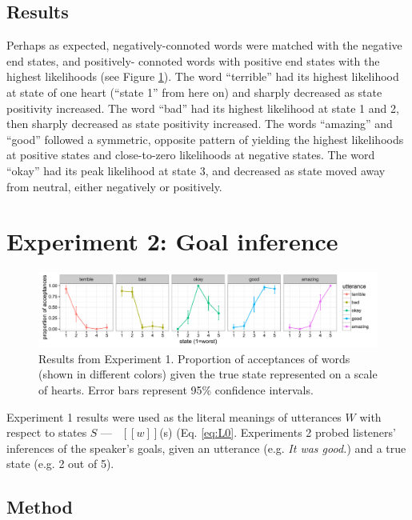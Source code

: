 \documentclass[10pt,letterpaper]{article}
\newcommand{\denote}[1]{\mbox{ $[\![ #1 ]\!]$}}
\begin{document}
\subsection{Results}

Perhaps as expected, negatively-connoted words were matched with the negative end states, and positively- connoted words with positive end states with the highest likelihoods (see Figure \ref{fig:exp1}). The word ``terrible'' had its highest likelihood at state of one heart (``state 1'' from here on) and sharply decreased as state positivity increased. The word ``bad'' had its highest likelihood at state 1 and 2, then sharply decreased as state positivity increased. The words ``amazing'' and ``good'' followed a symmetric, opposite pattern of yielding the highest likelihoods at positive states and close-to-zero likelihoods at negative states. The word ``okay'' had its peak likelihood at state 3, and decreased as state moved away from neutral, either negatively or positively.

\section{Experiment 2: Goal inference}

\begin{figure}[t]
\begin{center} 
  \includegraphics[width=.9\textwidth]{figures/exp1.pdf}
  \caption{\label{fig:exp1} Results from Experiment 1. Proportion of acceptances of words (shown in different colors) given the true state represented on a scale of hearts. Error bars represent 95\% confidence intervals.}
  \end{center} 
\end{figure}

Experiment 1 results were used as the literal meanings of utterances $W$ with respect to states $S$ --- \denote{w}(s) (Eq. \ref{eq:L0}.
Experiments 2 probed listeners' inferences of the speaker's goals, given an utterance (e.g. \emph{It was good.}) and a true state (e.g. 2 out of 5). 

\subsection{Method} 
\end{document}
